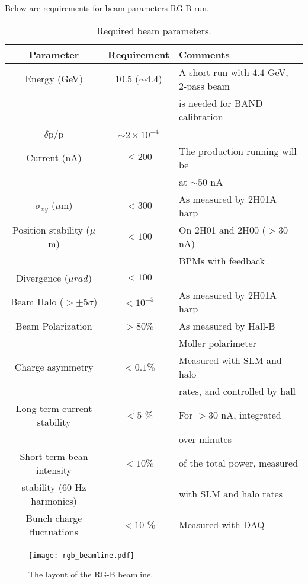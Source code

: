 \documentclass[12pt]{article}
\begin{document}
Below are requirements for beam parameters RG-B run.  

 \begin{table}[htb]
 \centering
 \begin{tabular}{|c|c|l|}
\hline
Parameter & Requirement &Comments \\ \hline 
Energy (GeV) & $10.5$ ($\sim 4.4$) & A short run with $4.4$ GeV, 2-pass beam  \\ 
&&is needed for BAND calibration \\ \hline
$\delta$p/p & $\sim 2\times 10^{-4}$ & \\ \hline 
Current (nA) & $\le 200$ & The production running will be \\ && at $\sim 50$ nA \\ \hline
$\sigma_{xy}$ ($\mu$m) &$ < 300$& As measured by 2H01A harp \\ \hline 
Position stability ($\mu$m) & $< 100$ & On 2H01 and 2H00 ($>30$nA) \\ 
&&BPMs with feedback \\ \hline
Divergence ($\mu rad$) & $< 100$&  \\ \hline 
Beam Halo ($> \pm 5\sigma$) &$< 10^{-5}$&As measured by 2H01A harp \\ \hline
Beam Polarization &$> 80$\%&As measured by Hall-B \\&&Moller polarimeter \\ \hline
Charge asymmetry &$<0.1$\%& Measured with SLM and halo  \\&& rates, and controlled by hall \\ \hline
Long term current stability & $< 5$ \% & For $>30$ nA, integrated \\
&&over minutes \\ \hline 
Short term bean intensity & $<10$\%& of the total power, measured \\stability (60 Hz harmonics) && with SLM and halo rates \\ \hline
Bunch charge fluctuations &$< 10$ \% & Measured with DAQ \\ \hline
 \end{tabular}
\caption{ Required beam parameters.} 
\label{tab:beam_par}
\end{table}

\begin{figure}[hbt]
\begin{center}
\texttt{[image: rgb\_beamline.pdf]}
\end{center}
\caption{ \label{fig:beamline} \baselineskip 13pt 
The layout of the RG-B beamline. }
\end{figure}
\end{document}
